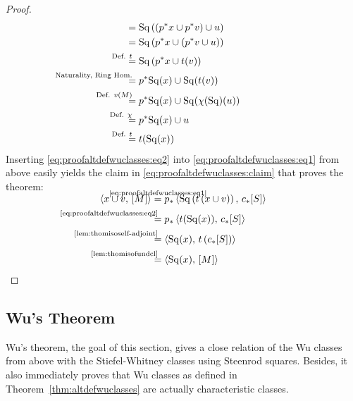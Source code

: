 \begin{Thm}
\begin{proof}
\begin{align}
      &=
        \SQ\left(\left(\pb p x\cup \pb p\Vu\right) \cup \U\right)
      \\\notag
      &=
        \SQ\left(\pb p x\cup \left(\pb p\Vu \cup \U\right)\right)
      \\\notag
      &\equalsby{Def. $\thomiso$}
       \SQ\left(\pb p x\cup \thomiso(\Vu)\right)
      \\\notag
      &\equalsby{Naturality, Ring Hom.}
        \pb p\SQ(x) \cup \SQ(\thomiso(\Vu))
      \\\notag
      &\equalsby{Def. $\V{M}$}
        \pb p\SQ(x) \cup \SQ(\antipode(\SQ)(u))
      \\\notag
      &\equalsby{Def. $\antipode$}
        \pb p\SQ(x) \cup u
      \\\label{eq:proofaltdefwuclasses:eq2}
      &\equalsby{Def. $\thomiso$}
        \thomiso(\SQ(x))
    \end{align}
    Inserting \eqref{eq:proofaltdefwuclasses:eq2} into
    \eqref{eq:proofaltdefwuclasses:eq1} from above easily yields the
    claim in \eqref{eq:proofaltdefwuclasses:claim} that proves the theorem:
    \begin{align*}
      \SwapAboveDisplaySkip
      \capped{x\cup \Vu}{\fundcl M}
      &\clapequalsby{\eqref{eq:proofaltdefwuclasses:eq1}}
        \pf p\capped
        {\SQ\left(\thomiso\left(x\cup\Vu\right)\right)}
        {\pf\collapse\fundcl{\Sph}}
      \\
      &\equalsby{\eqref{eq:proofaltdefwuclasses:eq2}}
        \pf p\capped
        {\thomiso(\SQ(x))}
        {\pf\collapse\fundcl{\Sph}}
      \\
      &\equalsby{\ref{lem:thomisoself-adjoint}}
        \capped
        {\SQ(x)}
        {\thomiso\left(\pf\collapse\fundcl{\Sph}\right)}
      \\
      &\equalsby{\ref{lem:thomisofundcl}}
        \capped
        {\SQ(x)}
        {\fundcl M}
        \qedhere
    \end{align*}
  \end{proof}
\end{Thm}


\subsection{Wu's Theorem}\label{sec:wutheorem}
Wu's theorem, the goal of this section, gives a close relation of
the Wu classes from above with the Stiefel-Whitney classes using
Steenrod squares. Besides, it also immediately proves that Wu classes
as defined in Theorem~\ref{thm:altdefwuclasses} are actually characteristic
classes.

